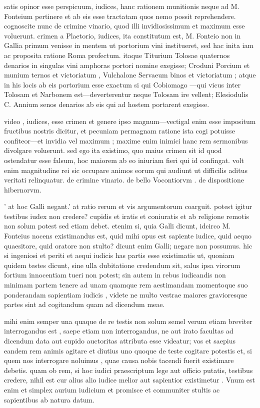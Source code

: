  satis opinor esse perspicuum, iudices, hanc rationem munitionis neque ad M. Fonteium pertinere et ab eis esse tractatam quos nemo possit reprehendere. cognoscite nunc de crimine vinario, quod illi invidiosissimum et maximum esse voluerunt. crimen a Plaetorio, iudices, ita constitutum est, M. Fonteio non in Gallia primum venisse in mentem ut portorium vini institueret, sed hac inita iam ac proposita ratione Roma profectum. itaque Titurium Tolosae quaternos denarios in singulas vini amphoras portori nomine exegisse; Croduni Porcium et munium ternos et victoriatum , Vulchalone Servaeum binos et victoriatum ; atque in his locis ab eis portorium esse exactum si qui Cobiomago —qui vicus inter Tolosam et Narbonem est—deverterentur neque Tolosam ire vellent; Elesiodulis C. Annium senos denarios ab eis qui ad hostem portarent exegisse.

 video , iudices, esse crimen et genere ipso magnum—vectigal enim esse impositum fructibus nostris dicitur, et pecuniam permagnam ratione ista cogi potuisse confiteor—et invidia vel maximum ; maxime enim inimici hanc rem sermonibus divolgare voluerunt. sed ego ita existimo, quo maius crimen sit id quod ostendatur esse falsum, hoc maiorem ab eo iniuriam fieri qui id confingat. volt enim magnitudine rei sic occupare animos eorum qui audiunt ut difficilis aditus veritati relinquatur. de crimine vinario. de bello Vocontiorvm . de dispositione hibernorvm.

 ' at hoc Galli negant.' at ratio rerum et vis argumentorum coarguit. potest igitur testibus iudex non credere? cupidis et iratis et coniuratis et ab religione remotis non solum potest sed etiam debet. etenim si, quia Galli dicunt, idcirco M. Fonteius nocens existimandus est, quid mihi opus est sapiente iudice, quid aequo quaesitore, quid oratore non stulto? dicunt enim Galli; negare non possumus. hic si ingeniosi et periti et aequi iudicis has partis esse existimatis ut, quoniam quidem testes dicunt, sine ulla dubitatione credendum sit, salus ipsa virorum fortium innocentiam tueri non potest; sin autem in rebus iudicandis non minimam partem tenere ad unam quamque rem aestimandam momentoque suo ponderandam sapientiam iudicis , videte ne multo vestrae maiores gravioresque partes sint ad cogitandum quam ad dicendum meae.

 mihi enim semper una quaque de re testis non solum semel verum etiam breviter interrogandus est , saepe etiam non interrogandus, ne aut irato facultas ad dicendum data aut cupido auctoritas attributa esse videatur; vos et saepius eandem rem animis agitare et diutius uno quoque de teste cogitare potestis et, si quem nos interrogare noluimus , quae causa nobis tacendi fuerit existimare debetis. quam ob rem, si hoc iudici praescriptum lege aut officio putatis, testibus credere, nihil est cur alius alio iudice melior aut sapientior existimetur . Vnum est enim et simplex aurium iudicium et promisce et communiter stultis ac sapientibus ab natura datum.

